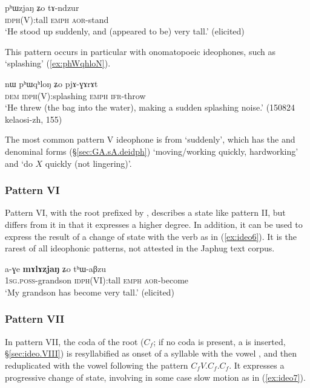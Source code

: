   \begin{exe} 
\ex  \label{ex:ideo5}
\gll  pʰɯzjaŋ ʑo tɤ-ndzur   \\
\textsc{idph}(V):tall \textsc{emph} \textsc{aor}-stand \\
\glt `He stood up suddenly, and (appeared to be) very tall.'  (elicited)
\end{exe}
 
This pattern occurs in particular with onomatopoeic ideophones, such as  `splashing' (\ref{ex:phWqhloN}).

  \begin{exe} 
\ex  \label{ex:phWqhloN}
\gll nɯ pʰɯqʰloŋ ʑo pjɤ-ɣɤrɤt \\
\textsc{dem} \textsc{idph}(V):splashing \textsc{emph} \textsc{ifr}-throw \\
\glt `He threw (the bag into the water), making a sudden splashing noise.' (150824 kelaosi-zh, 155)
 \end{exe}
 
 The most common pattern V ideophone is   from  `suddenly', which has  the  and   denominal forms (§\ref{sec:GA.sA.deidph})  `moving/working quickly, hardworking' and  `do $X$ quickly (not lingering)'.

\subsubsection{Pattern VI} \label{sec:ideo.VI}
Pattern VI, with the root prefixed by , describes a state like pattern II, but differs from it in that it expresses a higher degree. In addition, it can be used to express the result of a change of state with the verb  as in (\ref{ex:ideo6}). It is the rarest of all ideophonic patterns, not attested in the Japhug text corpus.

 \begin{exe} 
\ex  \label{ex:ideo6}
\gll a-ɣe \textbf{mɤlɤzjaŋ} ʑo tʰɯ-aβzu   \\
\textsc{1sg}.\textsc{poss}-grandson \textsc{idph}(VI):tall \textsc{emph} \textsc{aor}-become \\
\glt `My grandson has become very tall.'  (elicited)
 \end{exe}

  \subsubsection{Pattern VII} \label{sec:ideo.VII}
In pattern VII, the coda of the root ($C_f$; if no coda is present, a  is inserted, §\ref{sec:ideo.VIII}) is resyllabified as onset of a syllable with the vowel , and then reduplicated with the vowel  following the pattern $C_fV$.$C_f$.$C_f$. It  expresses a progressive change of state, involving in some case slow motion as in (\ref{ex:ideo7}).
 
